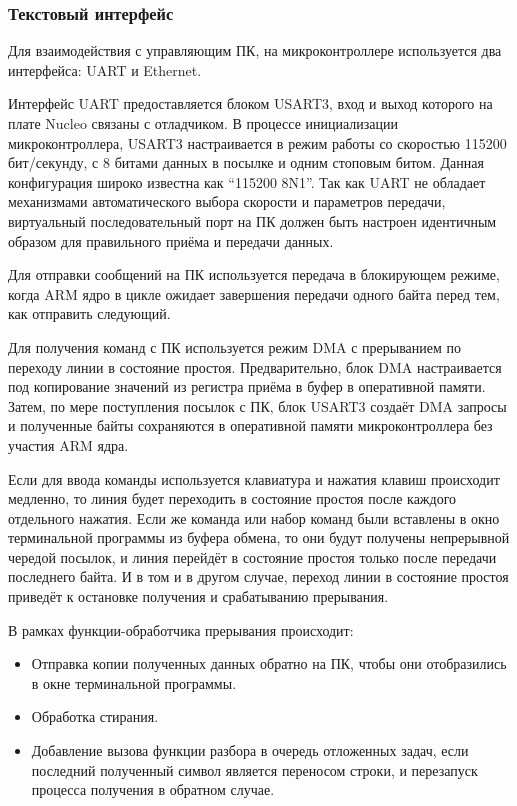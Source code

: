 \documentclass[rusmathsym, eqnumwithinsec, amspack, hyperref]{bomgost}
\begin{document}
\subsubsection{Текстовый интерфейс}

Для взаимодействия с управляющим ПК, на микроконтроллере используется два интерфейса: UART и Ethernet.

Интерфейс UART предоставляется блоком USART3, вход и выход которого на плате Nucleo связаны с отладчиком. В процессе инициализации микроконтроллера, USART3 настраивается в режим работы со скоростью 115200 бит/секунду, с 8 битами данных в посылке и одним стоповым битом. Данная конфигурация широко известна как ``115200 8N1''. Так как UART не обладает механизмами автоматического выбора скорости и параметров передачи, виртуальный последовательный порт на ПК должен быть настроен идентичным образом для правильного приёма и передачи данных.

Для отправки сообщений на ПК используется передача в блокирующем режиме, когда ARM ядро в цикле ожидает завершения передачи одного байта перед тем, как отправить следующий.

Для получения команд с ПК используется режим DMA с прерыванием по переходу линии в состояние простоя. Предварительно, блок DMA настраивается под копирование значений из регистра приёма в буфер в оперативной памяти. Затем, по мере поступления посылок с ПК, блок USART3 создаёт DMA запросы и полученные байты сохраняются в оперативной памяти микроконтроллера без участия ARM ядра.

Если для ввода команды используется клавиатура и нажатия клавиш происходит медленно, то линия будет переходить в состояние простоя после каждого отдельного нажатия. Если же команда или набор команд были вставлены в окно терминальной программы из буфера обмена, то они будут получены непрерывной чередой посылок, и линия перейдёт в состояние простоя только после передачи последнего байта. И в том и в другом случае, переход линии в состояние простоя приведёт к остановке получения и срабатыванию прерывания.

В рамках функции-обработчика прерывания происходит:

\begin{itemize}
	\item Отправка копии полученных данных обратно на ПК, чтобы они отобразились в окне терминальной программы.
	\item Обработка стирания.
	\item Добавление вызова функции разбора в очередь отложенных задач, если последний полученный символ является переносом строки, и перезапуск процесса получения в обратном случае.
\end{itemize}
\end{document}

